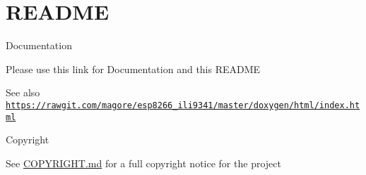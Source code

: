 \hypertarget{index_README}{}\section{R\+E\+A\+D\+ME}\label{index_README}
\begin{DoxyParagraph}{Documentation}

\begin{DoxyItemize}
\item Please use this link for Documentation and this R\+E\+A\+D\+ME 
\end{DoxyItemize}
\end{DoxyParagraph}
\begin{DoxySeeAlso}{See also}
\href{https://rawgit.com/magore/esp8266_ili9341/master/doxygen/html/index.html}{\tt https\+://rawgit.\+com/magore/esp8266\+\_\+ili9341/master/doxygen/html/index.\+html} 
\end{DoxySeeAlso}
\begin{DoxyParagraph}{Copyright}

\begin{DoxyItemize}
\item See \hyperlink{md_COPYRIGHT}{C\+O\+P\+Y\+R\+I\+G\+HT.md} for a full copyright notice for the project 
\end{DoxyItemize}
\end{DoxyParagraph}
